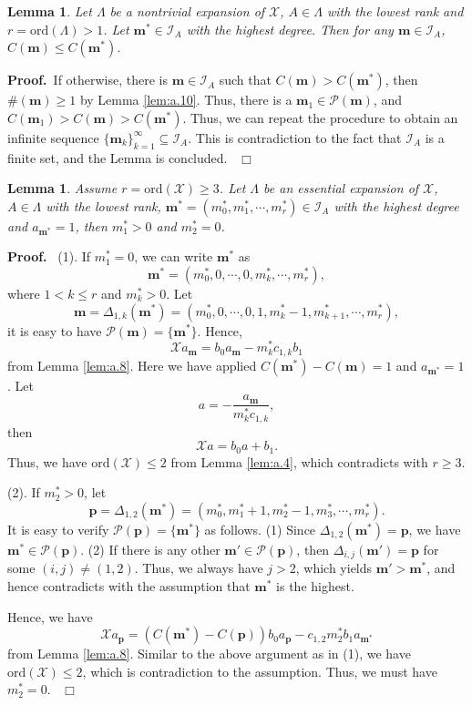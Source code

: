 \documentclass[preprint,12pt]{elsarticle}
\newtheorem{lem}[thm]{Lemma}
\newenvironment{proof}[1][Proof]{\textbf{#1.}\ }{\ $\Box$}
\begin{document}
\begin{lem}
\label{lem:c}
Let $\Lambda$ be a nontrivial expansion of $\mathscr{X}$, $A\in \Lambda$ with the lowest rank and $r =
\mathrm{ord}(\Lambda) > 1$. Let $\mathbf{m}^*\in \mathcal{I}_A$ with the highest
degree. Then for any $\mathbf{m}\in \mathcal{I}_A$, $C(\mathbf{m})\leq C(\mathbf{m}^*)$.
\end{lem}
\begin{proof}If otherwise, there is $\mathbf{m}\in\mathcal{I}_A$ such that $C(\mathbf{m}) > C(\mathbf{m}^*)$, then $\#(\mathbf{m}) \geq 1$ by Lemma \ref{lem:a.10}.  Thus, there is a $\mathbf{m}_1\in \mathcal{P}(\mathbf{m})$, and $C(\mathbf{m}_1) > C(\mathbf{m}) > C(\mathbf{m}^*)$. Thus, we can repeat the procedure to obtain an infinite sequence $\{\mathbf{m}_k\}_{k=1}^{\infty}\subseteq \mathcal{I}_A$.  This is contradiction to the fact that $\mathcal{I}_A$ is a finite set, and the Lemma is concluded.
\end{proof}

\begin{lem}
\label{lem:a.11} Assume $r= \mathrm{ord}(\mathscr{X}) \geq 3$. Let $\Lambda$ be an essential expansion of $\mathscr{X}$, $A\in \Lambda$ with the lowest rank, $\mathbf{m}^* = (m_0^*, m_1^*, \cdots,m_r^*)\in \mathcal{I}_A$ with the highest degree and $a_{\mathbf{m}^*} = 1$, then $m_1^*>0$ and $m_2^* = 0$.
\end{lem}
\begin{proof}
(1). If $m_1^* = 0$, we can write $\mathbf{m}^*$ as 
$$\mathbf{m}^* = (m_0^*, 0,\cdots, 0, m_k^*, \cdots, m_r^*),$$
where $1 < k \leq r$ and $m_k^* >0 $.
Let 
$$\mathbf{m} = \Delta_{1,k}(\mathbf{m}^*) = (m_0^*,0,\cdots,0,1,m_k^*-1,m_{k+1}^*,\cdots,m_r^*),$$
it is easy to have $\mathcal{P}(\mathbf{m}) = \{\mathbf{m}^*\}$. Hence,
$$\mathscr{X}a_{\mathbf{m}} = b_0 a_\mathbf{m} - m_k^* c_{1,k} b_1$$
from Lemma \ref{lem:a.8}. Here we have applied $C(\mathbf{m}^*) - C(\mathbf{m}) = 1$ and $a_{\mathbf{m}^*} = 1$. Let
$$a = -\dfrac{a_{\mathbf{m}}}{m_k^* c_{1,k}},$$
then 
$$\mathscr{X} a = b_0 a + b_1.$$
Thus, we have $\mathrm{ord}(\mathscr{X}) \leq 2$ from Lemma \ref{lem:a.4}, which contradicts with $r \geq 3$.

(2). If $m_2^*>0$, let 
$$\mathbf{p} = \Delta_{1,2}(\mathbf{m}^*) =
(m_0^*, m_1^*+1,m_2^*-1,m_3^*,\cdots,m_r^*).$$ 
It is easy to verify 
$\mathcal{P}(\mathbf{p}) = \{\mathbf{m^*}\}$ as follows. (1) Since $\Delta_{1,2}(\mathbf{m^*}) = \mathbf{p}$, we have $\mathbf{m^*}\in\mathcal{P}(\mathbf{p})$. (2) If there is any other $\mathbf{m'}\in \mathcal{P}(\mathbf{p})$, then $\Delta_{i,j}(\mathbf{m'})
=\mathbf{p}$ for some $(i,j)\not= (1,2)$. Thus, we always have $j>2$, which yields $\mathbf{m}' >\mathbf{m^*}$, and hence contradicts with the assumption that $\mathbf{m}^*$ is the highest.

Hence, we have
$$\mathscr{X}a_{\mathbf{p}} =  (C(\mathbf{m}^*) - C(\mathbf{p})) b_0 a_{\mathbf{p}} - c_{1,2} m_2^* b_1a_{\mathbf{m}^*}
$$
from Lemma \ref{lem:a.8}. Similar to the above argument as in (1), we have $\mathrm{ord}(\mathscr{X})\leq 2$, which is contradiction to the assumption. Thus, we must have $m_2^* = 0$.
\end{proof}
\end{document}
